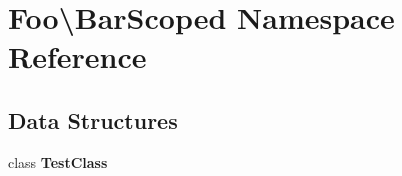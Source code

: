 \section{Foo\textbackslash{}Bar\+Scoped Namespace Reference}
\label{namespace_foo_1_1_bar_scoped}
\subsection*{Data Structures}
\begin{DoxyCompactItemize}
\item 
class {\bf Test\+Class}
\end{DoxyCompactItemize}
